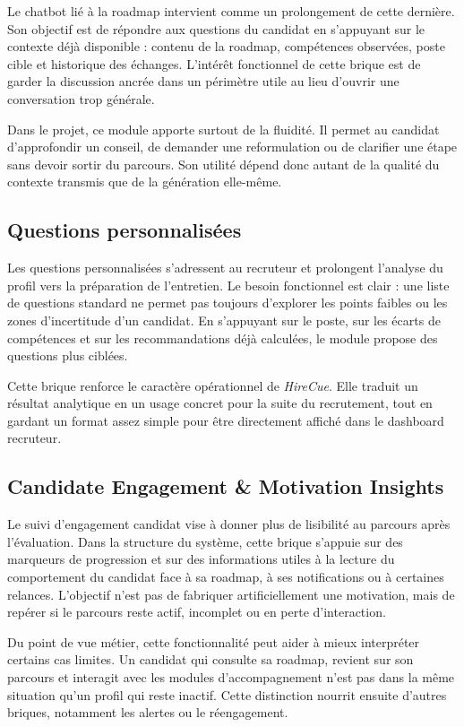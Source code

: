 Le chatbot lié à la roadmap intervient comme un prolongement de cette dernière. Son objectif est de répondre aux questions du candidat en s'appuyant sur le contexte déjà disponible : contenu de la roadmap, compétences observées, poste cible et historique des échanges. L'intérêt fonctionnel de cette brique est de garder la discussion ancrée dans un périmètre utile au lieu d'ouvrir une conversation trop générale.

Dans le projet, ce module apporte surtout de la fluidité. Il permet au candidat d'approfondir un conseil, de demander une reformulation ou de clarifier une étape sans devoir sortir du parcours. Son utilité dépend donc autant de la qualité du contexte transmis que de la génération elle-même.

\subsection{Questions personnalisées}

Les questions personnalisées s'adressent au recruteur et prolongent l'analyse du profil vers la préparation de l'entretien. Le besoin fonctionnel est clair : une liste de questions standard ne permet pas toujours d'explorer les points faibles ou les zones d'incertitude d'un candidat. En s'appuyant sur le poste, sur les écarts de compétences et sur les recommandations déjà calculées, le module propose des questions plus ciblées.

Cette brique renforce le caractère opérationnel de \textit{HireCue}. Elle traduit un résultat analytique en un usage concret pour la suite du recrutement, tout en gardant un format assez simple pour être directement affiché dans le dashboard recruteur.

\subsection{Candidate Engagement \& Motivation Insights}

Le suivi d'engagement candidat vise à donner plus de lisibilité au parcours après l'évaluation. Dans la structure du système, cette brique s'appuie sur des marqueurs de progression et sur des informations utiles à la lecture du comportement du candidat face à sa roadmap, à ses notifications ou à certaines relances. L'objectif n'est pas de fabriquer artificiellement une motivation, mais de repérer si le parcours reste actif, incomplet ou en perte d'interaction.

Du point de vue métier, cette fonctionnalité peut aider à mieux interpréter certains cas limites. Un candidat qui consulte sa roadmap, revient sur son parcours et interagit avec les modules d'accompagnement n'est pas dans la même situation qu'un profil qui reste inactif. Cette distinction nourrit ensuite d'autres briques, notamment les alertes ou le réengagement.

